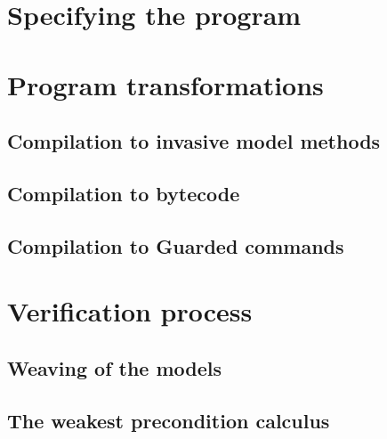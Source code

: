 


\section{Specifying the program}
\label{specs}


\section{Program transformations}
\label{transf}
\subsection{Compilation to invasive model methods}


\subsection{Compilation to bytecode}


\subsection{Compilation to Guarded commands}
\label{gc}


\section{Verification process}
\label{verif}
\subsection{Weaving of the models}


\subsection{The weakest precondition calculus}
